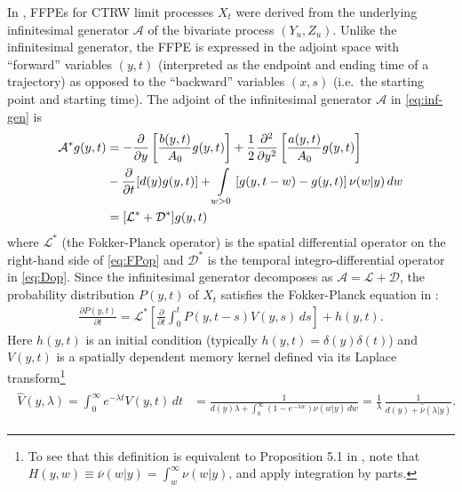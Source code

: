 \documentclass[a4paper,12pt]{elsarticle}
\numberwithin{equation}{section}
\theoremstyle{plain}
\theoremstyle{definition}
\theoremstyle{remark}
\numberwithin{equation}{section}
\newcommand{\1}{\mathbf 1}
\newcommand{\del}{\partial}
\begin{document}
In \cite{BaeumerStraka16}, FFPEs for CTRW limit processes $X_t$ were derived
from the underlying infinitesimal generator $\mathcal A$ of the bivariate
process $(Y_u, Z_u)$.
Unlike the infinitesimal generator, the FFPE is expressed in the adjoint
space with ``forward'' variables $(y,t)$ (interpreted as the endpoint and
ending time of a trajectory) as opposed to the ``backward'' variables $(x,s)$
(i.e.\ the starting point and starting time).
The adjoint of the infinitesimal generator $\mathcal A$ in \eqref{eq:inf-gen}
is
\begin{align}
\label{eq:FPop}
\mathcal A^* g(y,t)
&= -\frac{\partial }{\partial y}\left[\frac{b(y,t)}{A_0} g(y,t)\right]
+\frac{1}{2}\frac{\partial^2 }{\partial y^2}\left[\frac{a(y,t)}{A_0} g(y,t)\right]
\\
\label{eq:Dop}
&-\frac{\partial }{\partial t}[d(y) g(y,t)]
+ \int\limits_{w > 0} \left[g(y, t-w)-g(y, t)
\right] \nu(w | y) \, dw
\\ \notag
&= [\mathcal L^* + \mathcal D^*] g(y,t)
\end{align}
where $\mathcal L^*$ (the Fokker-Planck operator) is the spatial differential
operator on the right-hand side of \eqref{eq:FPop} and $\mathcal D^*$ is the
temporal integro-differential operator in \eqref{eq:Dop}.
Since the infinitesimal generator decomposes as
$\mathcal A = \mathcal L + \mathcal D$, the probability distribution $P(y,t)$
of $X_t$ satisfies the Fokker-Planck equation in \cite[(5.2)]{BaeumerStraka16}:
\begin{align} \label{eq:FFPE}
\frac{\del P(y,t)}{\del t} = \mathcal L^* \left[ \frac{\partial}{\partial t}
\int_0^t P(y,t-s) V(y,s)\,ds \right] + h(y,t).
\end{align}
Here $h(y,t)$ is an initial condition (typically $h(y,t) = \delta(y) \delta(t)$)
and $V(y,t)$ is a spatially dependent memory kernel defined via its Laplace
transform\footnote{To see that this definition is equivalent to Proposition 5.1
in \cite{BaeumerStraka16}, note that $H(y,w) \equiv \overline \nu(w|y) = \int_w^\infty \nu(w|y)$,
and apply integration by parts.}
\begin{align} \label{eq:LT-renewal-measure}
\begin{split}
\hat V(y,\lambda) = \int_0^\infty e^{-\lambda t} V(y,t)\,dt
&= \frac{1}{d(y)\lambda + \int_0^\infty (1-e^{-\lambda w})
\nu(w | y)\,dw}
= \frac{1}{\lambda} \, \frac{1}{d(y) + \hat{\overline{\nu}}(\lambda|y)}.
\end{split}
\end{align}
\end{document}
